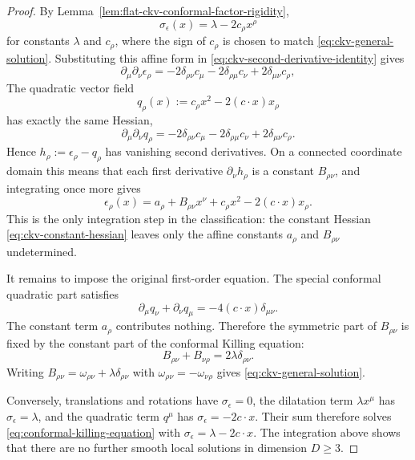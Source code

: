 \begin{proof}
By Lemma~\ref{lem:flat-ckv-conformal-factor-rigidity},
\[
  \sigma_\epsilon(x)=\lambda-2c_\rho x^\rho
\]
for constants \(\lambda\) and \(c_\rho\), where the sign of \(c_\rho\) is
chosen to match \eqref{eq:ckv-general-solution}.  Substituting this affine
form in \eqref{eq:ckv-second-derivative-identity} gives
\begin{equation}
  \partial_\mu\partial_\nu\epsilon_\rho
  =
  -2\delta_{\rho\nu}c_\mu
  -2\delta_{\rho\mu}c_\nu
  +2\delta_{\mu\nu}c_\rho ,
  \label{eq:ckv-constant-hessian}
\end{equation}
The quadratic vector field
\[
  q_\rho(x):=c_\rho x^2-2(c\cdot x)x_\rho
\]
has exactly the same Hessian,
\[
  \partial_\mu\partial_\nu q_\rho
  =
  -2\delta_{\rho\nu}c_\mu
  -2\delta_{\rho\mu}c_\nu
  +2\delta_{\mu\nu}c_\rho .
\]
Hence \(h_\rho:=\epsilon_\rho-q_\rho\) has vanishing second derivatives.  On
a connected coordinate domain this means that each first derivative
\(\partial_\nu h_\rho\) is a constant \(B_{\rho\nu}\), and integrating once
more gives
\begin{equation}
  \epsilon_\rho(x)
  =
  a_\rho+B_{\rho\nu}x^\nu+c_\rho x^2-2(c\cdot x)x_\rho .
  \label{eq:ckv-integrated-polynomial}
\end{equation}
This is the only integration step in the classification: the constant Hessian
\eqref{eq:ckv-constant-hessian} leaves only the affine constants \(a_\rho\)
and \(B_{\rho\nu}\) undetermined.

It remains to impose the original first-order equation.  The special
conformal quadratic part satisfies
\[
  \partial_\mu q_\nu+\partial_\nu q_\mu
  =
  -4(c\cdot x)\delta_{\mu\nu}.
\]
The constant term \(a_\rho\) contributes nothing.  Therefore the symmetric
part of \(B_{\rho\nu}\) is fixed by the constant part of the conformal Killing
equation:
\[
  B_{\rho\nu}+B_{\nu\rho}=2\lambda\delta_{\rho\nu}.
\]
Writing \(B_{\rho\nu}=\omega_{\rho\nu}+\lambda\delta_{\rho\nu}\) with
\(\omega_{\rho\nu}=-\omega_{\nu\rho}\) gives
\eqref{eq:ckv-general-solution}.

Conversely, translations and rotations have \(\sigma_\epsilon=0\), the
dilatation term \(\lambda x^\mu\) has
\(\sigma_\epsilon=\lambda\), and the quadratic term \(q^\mu\) has
\(\sigma_\epsilon=-2c\cdot x\).  Their sum therefore solves
\eqref{eq:conformal-killing-equation} with
\(\sigma_\epsilon=\lambda-2c\cdot x\).  The integration above shows that
there are no further smooth local solutions in dimension \(D\ge3\).
\end{proof}

